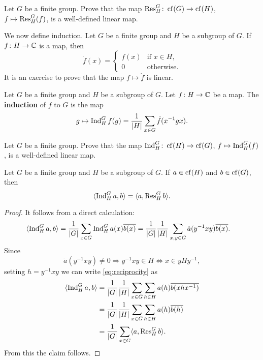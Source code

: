 \begin{exercise}
\label{xca:restriction}
    Let $G$ be a finite group. Prove that
    the map $\operatorname{Res}_H^G\colon\operatorname{cf}(G)\to\operatorname{cf}(H)$, $f\mapsto\operatorname{Res}_H^G(f)$, 
    is a well-defined linear map. 
\end{exercise}

We now define induction. Let $G$ be a finite group
and $H$ be a subgroup of $G$. If $f\colon H\to\mathbb{C}$ is a map, 
then 
\[
\dot{f}(x)=\begin{cases}
    f(x) & \text{if $x\in H$},\\
    0 & \text{otherwise}.
    \end{cases}
\]
It is an exercise to prove that
the map $f\mapsto\dot{f}$ is linear. 

\begin{definition}
    Let $G$ be a finite group and $H$ be a subgroup of $G$. Let
    $f\colon H\to\mathbb{C}$ be
    a map. The \textbf{induction}
    of $f$ to $G$ is the map 
    \begin{align*}
      g\mapsto\operatorname{Ind}_H^Gf(g)=\frac{1}{|H|}\sum_{x\in G}\dot{f}(x^{-1}gx).
    \end{align*}
\end{definition}

\begin{exercise}
\label{xca:induction}
    Let $G$ be a finite group. Prove that
    the map $\operatorname{Ind}_H^G\colon\operatorname{cf}(H)\to\operatorname{cf}(G)$, $f\mapsto\operatorname{Ind}_H^G(f)$, 
    is a well-defined linear map. 
\end{exercise}

\begin{theorem}
    Let $G$ be a finite group and $H$ be a subgroup of $G$. 
    If $a\in\operatorname{cf}(H)$ and $b\in\operatorname{cf}(G)$, then
    \[
    \langle\operatorname{Ind}_H^Ga,b\rangle=\langle a,\operatorname{Res}_H^Gb\rangle.
    \]
\end{theorem}

\begin{proof}
    It follows from a direct calculation:
    \begin{equation}
    \label{eq:reciprocity}
    \begin{aligned}
        \langle\operatorname{Ind}_H^Ga,b\rangle 
        &= \frac{1}{|G|}\sum_{x\in G}\operatorname{Ind}_H^Ga(x)\overline{b(x)}
        = \frac{1}{|G|}\frac{1}{|H|}\sum_{x,y\in G}\dot{a}(y^{-1}xy)\overline{b(x)}.
    \end{aligned}
    \end{equation}
    Since 
    \[
    \dot{a}(y^{-1}xy)\ne 0\Longrightarrow
    y^{-1}xy\in H\Longleftrightarrow x\in yHy^{-1},
    \]
    setting $h=y^{-1}xy$ 
    we can write \eqref{eq:reciprocity} as 
    \begin{align*}
        \langle\operatorname{Ind}_H^Ga,b\rangle
        &=\frac{1}{|G|}\frac{1}{|H|}\sum_{x\in G}\sum_{h\in H}a(h)\overline{b(xhx^{-1})}\\
        &=\frac{1}{|G|}\frac{1}{|H|}\sum_{x\in G}\sum_{h\in H}a(h)\overline{b(h)}\\
        &=\frac{1}{|G|}\sum_{x\in G}\langle a,\operatorname{Res}_H^Gb\rangle.
    \end{align*}
    From this the claim follows. 
\end{proof}

